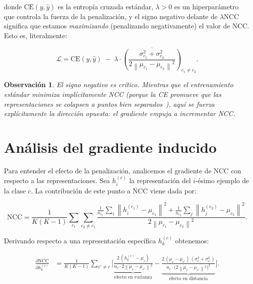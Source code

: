 \documentclass[12pt,a4paper]{report}
\newtheorem{remark}{Observación}[chapter]
\newcommand{\norm}[1]{\left\lVert#1\right\rVert}
\newcommand{\NCC}{\text{NCC}}
\newcommand{\CE}{\text{CE}}
\begin{document}
donde $\CE(y, \hat{y})$ es la entropía cruzada estándar, $\lambda > 0$ es un hiperparámetro que controla la fuerza de la penalización, y el signo negativo delante de $\lambda\NCC$ significa que estamos \emph{maximizando} (penalizando negativamente) el valor de NCC. Esto es, literalmente:

\begin{equation}
    \mathcal{L} = \CE(y, \hat{y}) \;-\; \lambda \cdot \overline{\left(\frac{\sigma_{c_1}^2 + \sigma_{c_2}^2}{2\norm{\mu_{c_1} - \mu_{c_2}}^2}\right)}_{c_1 \neq c_2}.
\label{eq:loss_ncc_expanded}
\end{equation}

\begin{remark}
El signo negativo es crítico. Mientras que el entrenamiento estándar minimiza implícitamente NCC (porque la CE promueve que las representaciones se colapsen a puntos bien separados~\cite{papyan2020prevalence}), aquí se fuerza explícitamente la dirección opuesta: el gradiente empuja a \emph{incrementar} NCC.
\end{remark}

\section{Análisis del gradiente inducido}

Para entender el efecto de la penalización, analicemos el gradiente de $\NCC$ con respecto a las representaciones. Sea $h_i^{(c)}$ la representación del $i$-ésimo ejemplo de la clase $c$. La contribución de este punto a NCC viene dada por:

\begin{equation}
    \NCC = \frac{1}{K(K-1)} \sum_{c_1} \sum_{c_2 \neq c_1}
    \frac{\frac{1}{n_{c_1}}\sum_{i}\norm{h_i^{(c_1)} - \mu_{c_1}}^2 + \frac{1}{n_{c_2}}\sum_{j}\norm{h_j^{(c_2)} - \mu_{c_2}}^2}
    {2 \norm{\mu_{c_1} - \mu_{c_2}}^2}.
\end{equation}

Derivando respecto a una representación específica $h_k^{(c)}$ obtenemos:

\begin{align}
    \frac{\partial \NCC}{\partial h_k^{(c)}} &=
    \frac{1}{K(K-1)} \sum_{c' \neq c} \Bigg[
    \underbrace{\frac{2\,(h_k^{(c)} - \mu_c)}{n_c \cdot 2 \norm{\mu_c - \mu_{c'}}^2}}_{\text{efecto en varianza}}
    -
    \underbrace{\frac{2\,(\mu_c - \mu_{c'})\,(\sigma_c^2 + \sigma_{c'}^2)}{n_c \cdot \big(2 \norm{\mu_c - \mu_{c'}}^2\big)^2}}_{\text{efecto en distancia}}
    \Bigg].
    \label{eq:grad_ncc}
\end{align}
\end{document}
